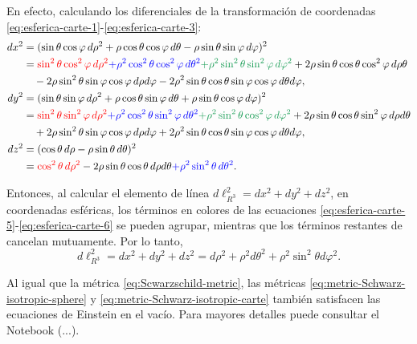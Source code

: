 \documentclass[letterpaper,11pt]{article}
\begin{document}
En efecto, calculando los diferenciales de la transformación de coordenadas \eqref{eq:esferica-carte-1}-\eqref{eq:esferica-carte-3}:
\begin{align}
    dx^2 &= (\sin\theta \cos\varphi \,d\rho^2 + \rho \cos\theta\cos\varphi \,d\theta - \rho \sin\theta \sin \varphi \,d\varphi)^2 \nonumber\\
    &= {\color{red} \sin^2\theta \cos^2\varphi \,d\rho^2}  {\color{blue} + \rho^2 \cos^2\theta \cos^2\varphi \,d\theta^2} {\color{ForestGreen} + \rho^2 \sin^2\theta \sin^2\varphi \,d\varphi^2} + 2\rho \sin\theta \cos\theta \cos^2\varphi \,d\rho\theta \nonumber\\
    & \quad  - 2\rho \sin^2\theta \sin\varphi \cos\varphi \,d\rho d\varphi - 2\rho^2 \sin\theta \cos\theta \sin\varphi \cos\varphi \,d\theta d\varphi,  \label{eq:esferica-carte-4}\\
    dy^2 &= (\sin\theta \sin\varphi \,d\rho^2 + \rho \cos\theta\sin\varphi \,d\theta + \rho \sin\theta \cos \varphi \,d\varphi)^2 \nonumber\\
    &= {\color{red}\sin^2\theta \sin^2\varphi \,d\rho^2}  {\color{blue} + \rho^2 \cos^2\theta \sin^2\varphi \,d\theta^2}  {\color{ForestGreen} + \rho^2 \sin^2\theta \cos^2\varphi\,d\varphi^2} + 2 \rho\sin\theta \cos\theta \sin^2\varphi \,d\rho d\theta \nonumber \\
    & \quad  + 2 \rho\sin^2\theta \sin\varphi \cos\varphi \,d\rho 
    d\varphi + 2 \rho^2 \sin\theta \cos\theta \sin\varphi \cos \varphi \,d\theta d\varphi, \label{eq:esferica-carte-5}\\
    dz^2 &= (\cos\theta \,d\rho - \rho\sin \theta \,d\theta)^2 \nonumber\\
    &= {\color{red}\cos^2\theta \,d\rho^2} - 2 \rho\sin\theta \cos\theta \,d\rho d\theta  {\color{blue} +
    \rho^2 \sin^2\theta \,d\theta^2}. \label{eq:esferica-carte-6}
\end{align}

 Entonces, al calcular el elemento de línea $d\ell^2_{R^3} = dx^2 + dy^2 + dz^2$, en coordenadas esféricas, los términos en colores de las ecuaciones \eqref{eq:esferica-carte-5}-\eqref{eq:esferica-carte-6} se pueden agrupar, mientras que los términos restantes de cancelan mutuamente. Por lo tanto, 
\begin{equation}
    d\ell^2_{R^3} = dx^2 + dy^2 + dz^2 = d \rho^2 + \rho^2 d\theta^2 + \rho^2 \sin^2\theta d\varphi^2.
\end{equation}

Al igual que la métrica \eqref{eq:Scwarzschild-metric}, las métricas \eqref{eq:metric-Schwarz-isotropic-sphere} y \eqref{eq:metric-Schwarz-isotropic-carte} también satisfacen las ecuaciones de Einstein en el vacío. Para mayores detalles puede consultar el Notebook (...).
\end{document}
